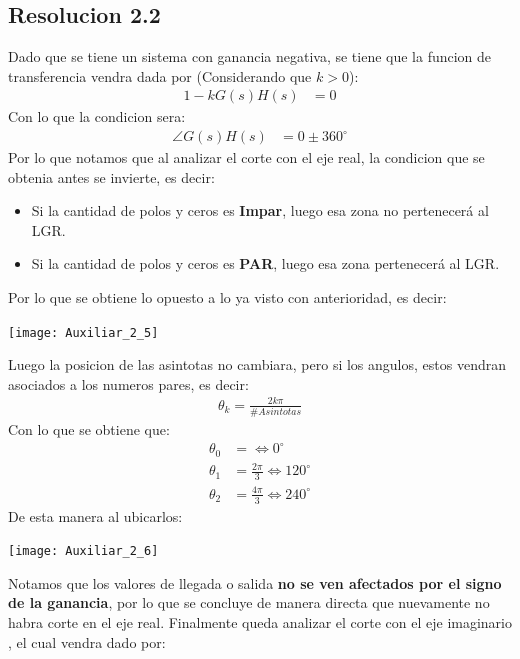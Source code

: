\documentclass[
  11pt,
  letterpaper,
   addpoints,
  ]{exam}
\begin{document}
\begin{questions}
\begin{solution}
\subsection*{Resolucion 2.2}
Dado que se tiene un sistema con ganancia negativa, se tiene que la funcion de transferencia vendra dada por (Considerando que $k>0$):
\begin{align}
    1-kG(s)H(s) &= 0
\end{align}
Con lo que la condicion sera:
\begin{align}
    \angle G(s)H(s) &= 0 \pm 360^{\circ} 
\end{align}
Por lo que notamos que al analizar el corte con el eje real, la condicion que se obtenia antes se invierte, es decir:
\begin{itemize}
    \item Si la cantidad de polos y ceros es \textbf{Impar}, luego esa zona no pertenecerá al LGR.
    \item Si la cantidad de polos y ceros es \textbf{PAR}, luego esa zona pertenecerá al LGR.
\end{itemize}
Por lo que se obtiene lo opuesto a lo ya visto con anterioridad, es decir:
\begin{center}
    \texttt{[image: Auxiliar\_2\_5]}
  \end{center}
Luego la posicion de las asintotas no cambiara, pero si los angulos, estos vendran asociados a los numeros pares, es decir:
\begin{align}
    \theta_{k} = \frac{2k \pi}{\#Asintotas}
\end{align}
Con lo que se obtiene que:
\begin{align}
    \theta_{0} &=   \Leftrightarrow 0^{\circ} \\
    \theta_{1} &=   \frac{2\pi}{3} \Leftrightarrow 120^{\circ} \\
    \theta_{2} &=  \frac{4\pi}{3} \Leftrightarrow 240^{\circ} 
\end{align}
De esta manera al ubicarlos:
\begin{center}
    \texttt{[image: Auxiliar\_2\_6]}
  \end{center}
Notamos que los valores de llegada o salida \textbf{no se ven afectados por el signo de la ganancia}, por lo que se concluye de manera directa que nuevamente no habra corte en el eje real. Finalmente queda analizar el corte con el eje imaginario , el cual vendra dado por:
\begin{align}

\end{align}
\end{solution}
\end{questions}
\end{document}

